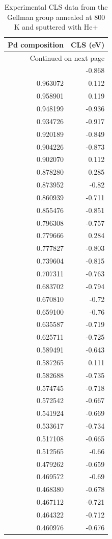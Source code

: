 \documentclass[number, sort&compress, review, 12pt]{elsarticle}
\begin{document}
\begin{longtable}{rr}
\caption{\label{gellman1}Experimental CLS data from the Gellman group annealed at 800 K and sputtered with He+}
\\
Pd composition & CLS (eV)\\
\hline
\endhead
\hline\multicolumn{2}{r}{Continued on next page} \\
\endfoot
\endlastfoot
0.970010 & -0.868\\
0.963072 & 0.112\\
0.958901 & 0.119\\
0.948199 & -0.936\\
0.934726 & -0.917\\
0.920189 & -0.849\\
0.904226 & -0.873\\
0.902070 & 0.112\\
0.878280 & 0.285\\
0.873952 & -0.82\\
0.860939 & -0.711\\
0.855476 & -0.851\\
0.796308 & -0.757\\
0.779666 & 0.284\\
0.777827 & -0.803\\
0.739604 & -0.815\\
0.707311 & -0.763\\
0.683702 & -0.794\\
0.670810 & -0.72\\
0.659100 & -0.76\\
0.635587 & -0.719\\
0.625711 & -0.725\\
0.589491 & -0.643\\
0.587265 & 0.111\\
0.582688 & -0.735\\
0.574745 & -0.718\\
0.572542 & -0.667\\
0.541924 & -0.669\\
0.533617 & -0.734\\
0.517108 & -0.665\\
0.512565 & -0.66\\
0.479262 & -0.659\\
0.469572 & -0.69\\
0.468380 & -0.678\\
0.467112 & -0.721\\
0.464322 & -0.712\\
0.460976 & -0.676\\

\end{longtable}
\end{document}
